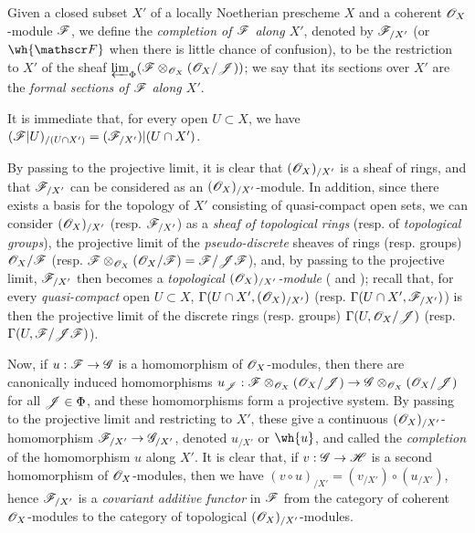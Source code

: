 \begin{definition}[10.8.4]
\label{1.10.8.4}
Given a closed subset $X'$ of a locally Noetherian prescheme $X$ and a coherent $\mathscr{O}_X$-module $\mathscr{F}$, we define the \emph{completion of $\mathscr{F}$ along $X'$}, denoted by $\mathscr{F}_{/X'}$ (or $\wh{\sh{F}}$ when there is little chance of confusion), to be the restriction to $X'$ of the sheaf
$\varprojlim_\Phi(\mathscr{F}\otimes_{\mathscr{O}_X}(\mathscr{O}_X/\mathscr{J}))$; we say that its sections over $X'$ are the \emph{formal sections of $\mathscr{F}$ along $X'$}.
\end{definition}

It is immediate that, for every open $U\subset X$, we have $(\mathscr{F}|U)_{/(U\cap X')}=(\mathscr{F}_{/X'})|(U\cap X')$.

By passing to the projective limit, it is clear that $(\mathscr{O}_X)_{/X'}$ is a sheaf of rings, and that $\mathscr{F}_{/X'}$ can be considered as an $(\mathscr{O}_X)_{/X'}$-module.
In addition, since there exists a basis for the topology of $X'$ consisting of quasi-compact open sets, we can consider $(\mathscr{O}_X)_{/X'}$ (resp. $\mathscr{F}_{/X'}$) as a \emph{sheaf of topological rings} (resp. of \emph{topological groups}), the projective limit of the \emph{pseudo-discrete} sheaves of rings (resp. groups) $\mathscr{O}_X/\mathscr{F}$ (resp. $\mathscr{F}\otimes_{\mathscr{O}_X}(\mathscr{O}_X/\mathscr{F})=\mathscr{F}/\mathscr{J}\mathscr{F}$), and, by passing to the projective limit, $\mathscr{F}_{/X'}$ then becomes a \emph{topological $(\mathscr{O}_X)_{/X'}$-module} ( and ); recall that, for every \emph{quasi-compact} open $U\subset X$, $\Gamma(U\cap X',(\mathscr{O}_X)_{/X'})$ (resp. $\Gamma(U\cap X',\mathscr{F}_{/X'})$) is then the projective limit of the discrete rings (resp. groups) $\Gamma(U,\mathscr{O}_X/\mathscr{J})$ (resp. $\Gamma(U,\mathscr{F}/\mathscr{J}\mathscr{F})$).

Now, if $u:\sh{F}\to\sh{G}$ is a homomorphism of $\mathscr{O}_X$-modules, then there are canonically induced homomorphisms $u_\sh{J}:\sh{F}\otimes_{\sh{O}_X}(\sh{O}_X/\sh{J})\to\sh{G}\otimes_{\sh{O}_X}(\sh{O}_X/\sh{J})$ for all $\mathscr{J}\in\Phi$, and these homomorphisms form a projective system.
By passing to the projective limit and restricting to $X'$, these give a continuous $(\mathscr{O}_X)_{/X'}$-homomorphism $\sh{F}_{/X'}\to\sh{G}_{/X'}$, denoted $u_{/X'}$ or $\wh{u}$, and called the \emph{completion} of the homomorphism $u$ along $X'$.
It is clear that, if $v:\sh{G}\to\sh{H}$ is a second homomorphism of $\mathscr{O}_X$-modules, then we have $(v\circ u)_{/X'}=(v_{/X'})\circ(u_{/X'})$, hence $\mathscr{F}_{/X'}$ is a \emph{covariant additive functor} in $\mathscr{F}$ from the category of coherent $\mathscr{O}_X$-modules to the category of topological $(\mathscr{O}_X)_{/X'}$-modules.

